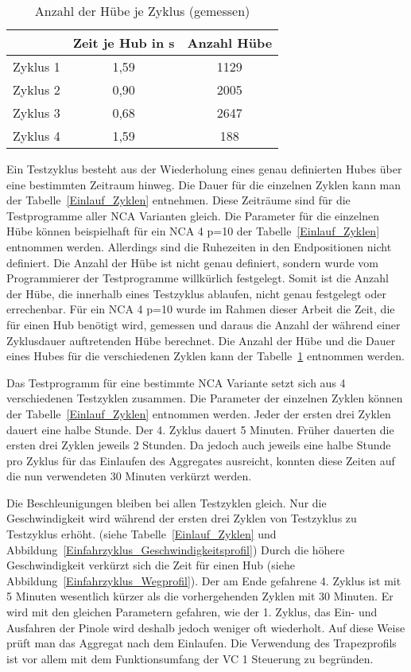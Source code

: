 \begin{table}[h]
\centering
\begin{tabular}{ccc}\toprule
& Zeit je Hub in s & Anzahl Hübe \\
\midrule
Zyklus 1 & 1,59 & 1129 \\
Zyklus 2 & 0,90 & 2005 \\
Zyklus 3 & 0,68 & 2647 \\
Zyklus 4 & 1,59 & 188 \\
\bottomrule
\end{tabular}
\caption{Anzahl der Hübe je Zyklus (gemessen)}
\label{Einlauf_Zyklen_Anzahl}
\end{table}


Ein Testzyklus besteht aus der Wiederholung eines genau definierten Hubes über eine bestimmten Zeitraum hinweg. Die Dauer für die einzelnen Zyklen kann man der Tabelle~\ref{Einlauf_Zyklen} entnehmen. Diese Zeiträume sind für die Testprogramme aller NCA Varianten gleich. Die Parameter für die einzelnen Hübe können beispielhaft für ein NCA 4 p=10 der Tabelle~\ref{Einlauf_Zyklen} entnommen werden. Allerdings sind die Ruhezeiten in den Endpositionen nicht definiert. Die Anzahl der Hübe ist nicht genau definiert, sondern wurde vom Programmierer der Testprogramme willkürlich festgelegt. Somit ist die Anzahl der Hübe, die innerhalb eines Testzyklus ablaufen, nicht genau festgelegt oder errechenbar. Für ein NCA 4 p=10 wurde im Rahmen dieser Arbeit die Zeit, die für einen Hub benötigt wird, gemessen und daraus die Anzahl der während einer Zyklusdauer auftretenden Hübe berechnet. Die Anzahl der Hübe und die Dauer eines Hubes für die verschiedenen Zyklen kann der Tabelle~\ref{Einlauf_Zyklen_Anzahl} entnommen werden.






Das Testprogramm für eine bestimmte NCA Variante setzt sich aus 4 verschiedenen Testzyklen zusammen. Die Parameter der einzelnen Zyklen können der Tabelle~\ref{Einlauf_Zyklen} entnommen werden. Jeder der ersten drei Zyklen dauert eine halbe Stunde. Der 4. Zyklus dauert 5 Minuten. Früher dauerten die ersten drei Zyklen jeweils 2 Stunden. Da jedoch auch jeweils eine halbe Stunde pro Zyklus für das Einlaufen des Aggregates ausreicht, konnten diese Zeiten auf die nun verwendeten 30 Minuten verkürzt werden.



Die Beschleunigungen bleiben bei allen Testzyklen gleich. Nur die Geschwindigkeit wird während der ersten drei Zyklen von Testzyklus zu Testzyklus erhöht. (siehe Tabelle~\ref{Einlauf_Zyklen} und Abbildung~\ref{Einfahrzyklus_Geschwindigkeitsprofil}) Durch die höhere Geschwindigkeit verkürzt sich die Zeit für einen Hub (siehe Abbildung~\ref{Einfahrzyklus_Wegprofil}). Der am Ende gefahrene 4. Zyklus ist mit 5 Minuten wesentlich kürzer als die vorhergehenden Zyklen mit 30 Minuten. Er wird mit den gleichen Parametern gefahren, wie der 1. Zyklus, das Ein- und Ausfahren der Pinole wird deshalb jedoch weniger oft wiederholt.  Auf diese Weise prüft man das Aggregat nach dem Einlaufen. Die Verwendung des Trapezprofils ist vor allem mit dem Funktionsumfang der VC 1 Steuerung zu begründen.






